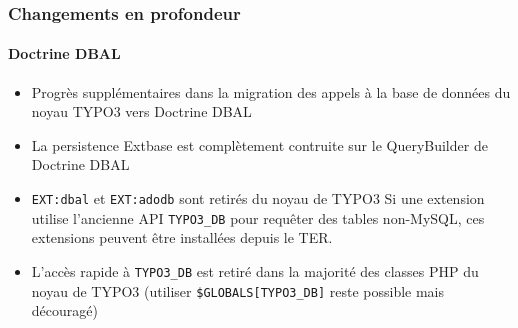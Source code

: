 
\begin{frame}[fragile]
	\frametitle{Changements en profondeur}
	\framesubtitle{Doctrine DBAL}

	\begin{itemize}
		\item Progrès supplémentaires dans la migration des appels à la base de données du noyau TYPO3 vers Doctrine DBAL
		\item La persistence Extbase est complètement contruite sur le QueryBuilder de Doctrine DBAL
		\item \texttt{EXT:dbal} et \texttt{EXT:adodb} sont retirés du noyau de TYPO3\newline
			\smaller
				Si une extension utilise l'ancienne API \texttt{TYPO3\_DB} pour requêter des tables non-MySQL,
				ces extensions peuvent être installées depuis le TER.
			\normalsize

		\item L'accès rapide à \texttt{TYPO3\_DB} est retiré dans la majorité des classes PHP du noyau de TYPO3\newline
			\smaller
				(utiliser \texttt{\$GLOBALS[TYPO3\_DB]} reste possible mais découragé)
			\normalsize

	\end{itemize}

\end{frame}



